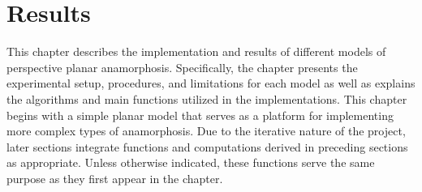 \documentclass[11pt, oneside, reqno]{book}
\begin{document}
\chapter{Results}
\label{ch:results}

This chapter describes the implementation and results of different models of perspective planar anamorphosis. Specifically, the chapter presents the experimental setup, procedures, and limitations for each model as well as explains the algorithms and main functions utilized in the implementations.
This chapter begins with a simple planar model that serves as a platform for implementing more complex types of anamorphosis. Due to the iterative nature of the project, later sections integrate functions and computations derived in preceding sections as appropriate. Unless otherwise indicated, these functions serve the same purpose as they first appear in the chapter.



%
%
%
%
\end{document}
